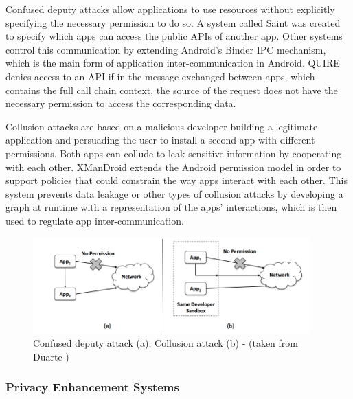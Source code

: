 Confused deputy attacks allow applications to use resources without explicitly specifying the necessary permission to do so. %
A system  called Saint \cite{ongtang2012semantically} was created to specify which apps can access the public APIs of another app. Other systems control this communication by extending Android’s Binder \ac{IPC} mechanism, which is the main form of application inter-communication in Android. QUIRE \cite{dietz2011quire} denies access to an API if in the message exchanged between apps, which contains the full call chain context, the source of the request does not have the necessary permission to access the corresponding data.

Collusion attacks are based on a malicious developer building a legitimate application and persuading the user to install a second app with different permissions. Both apps can collude to leak sensitive information by cooperating with each other. XManDroid \cite{bugiel2011xmandroid} extends the Android permission model in order to support policies that could constrain the way apps interact with each other. This system prevents data leakage or other types of collusion attacks by developing a graph at runtime with a representation of the apps’ interactions, which is then used to regulate app inter-communication.

\begin{figure}[t!]
	\centering
	\includegraphics[width=0.95\textwidth]{img/communicationattacks.png}
	\caption{Confused deputy attack (a); Collusion attack (b) - (taken from Duarte \cite{nunoduarte})}
	\label{fig:communicationattacks}
\end{figure}

\subsubsection{Privacy Enhancement Systems}

